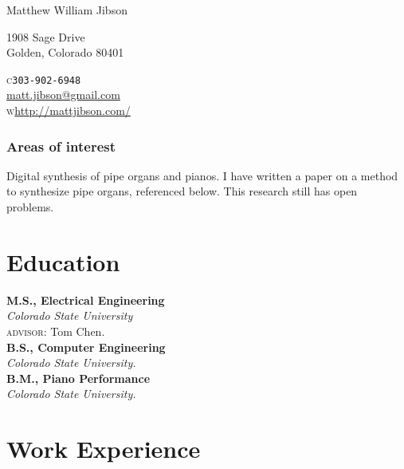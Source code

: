 \documentclass[10pt, a4paper]{article}
\newcommand{\years}[1]{\marginnote{\scriptsize #1}}
\begin{document}
\sloppy

\reversemarginpar
{{\huge Matthew William Jibson}\\[1.5cm]
\parbox{.5\linewidth}{
1908 Sage Drive\\
Golden, Colorado 80401
}
\parbox{.5\linewidth}{
\begin{flushright}
\textsc{c}\quad\texttt{303-902-6948}\\
{}\hspace{.26cm}\href{mailto:matt.jibson@gmail.com}{matt.jibson@gmail.com}\\
\textsc{w}\hspace{.24cm}\href{http://mattjibson.com/}{http://mattjibson.com/}\\
\end{flushright}
}

\subsubsection*{Areas of interest}
Digital synthesis of pipe organs and pianos. I have written a paper on a method to synthesize pipe organs, referenced below. This research still has open problems.

\section*{Education}

\noindent\years{2009}\textbf{M.S., Electrical Engineering}\\
\emph{Colorado State University} \\
{\small \textsc{advisor:} Tom Chen.}\\[.2cm]
\years{2007}\textbf{B.S., Computer Engineering}\\
\emph{Colorado State University.}\\[.2cm]
\years{2007}\textbf{B.M., Piano Performance}\\
\emph{Colorado State University.}

\section*{Work Experience}

}
\end{document}
